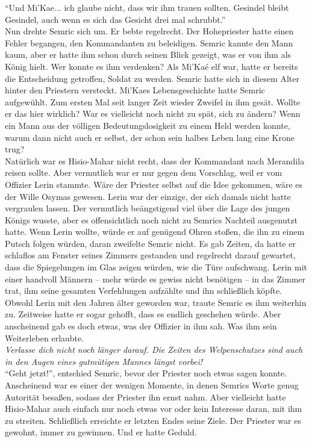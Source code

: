 ``Und Mi'Kae... ich glaube nicht, dass wir ihm trauen sollten. Gesindel bleibt Gesindel, auch wenn 
es sich das Gesicht drei mal schrubbt.''\\
Nun drehte Semric sich um. Er bebte regelrecht. Der Hohepriester hatte einen Fehler begangen, den  
Kommandanten zu beleidigen. Semric kannte den Mann kaum, aber er hatte ihm schon durch seinen Blick 
gezeigt, was er von ihm als König hielt. Wer konnte es ihm verdenken? Als Mi'Kaé elf war, hatte er 
bereits die Entscheidung getroffen, Soldat zu werden. Semric hatte sich in diesem Alter hinter den 
Priestern versteckt. Mi'Kaes Lebensgeschichte hatte Semric aufgewühlt. Zum ersten Mal seit langer 
Zeit wieder Zweifel in ihm gesät. Wollte er das hier wirklich? War es vielleicht noch nicht zu 
spät, sich zu ändern? Wenn ein Mann aus der völligen Bedeutungslosigkeit zu einem Held werden 
konnte, warum dann nicht auch er selbst, der schon sein halbes Leben lang eine Krone trug?\\
Natürlich war es Hisio-Mahar nicht recht, dass der Kommandant nach Merandila reisen sollte. Aber 
vermutlich war er nur gegen dem Vorschlag, weil er vom Offizier Lerin stammte. Wäre der Priester 
selbst auf die Idee gekommen, wäre es der Wille Osymas gewesen. Lerin war der einzige, der sich 
damals nicht hatte vergraulen lassen. Der vermutlich beängstigend viel über die Lage des jungen 
Königs wusste, aber es offensichtlich noch nicht zu Semrics Nachteil ausgenutzt hatte. Wenn Lerin 
wollte, würde er auf genügend Ohren stoßen, die ihn zu einem Putsch folgen würden, daran zweifelte 
Semric nicht. Es gab Zeiten, da hatte er schlaflos am Fenster seines Zimmers gestanden und 
regelrecht darauf gewartet, dass die Spiegelungen im Glas zeigen würden, wie die Türe aufschwang. 
Lerin mit einer handvoll Männern – mehr würde es gewiss nicht benötigen – in das Zimmer trat, ihm 
seine gesamten Verfehlungen aufzählte und ihn schließlich köpfte. Obwohl Lerin mit den Jahren älter 
geworden war, traute Semric es ihm weiterhin zu. Zeitweise hatte er sogar gehofft, dass es endlich 
geschehen würde. Aber anscheinend gab es doch etwas, was der Offizier in ihm sah. Was ihm sein 
Weiterleben erlaubte.\\
\textit{Verlasse dich nicht noch länger darauf. Die Zeiten des Welpenschutzes sind auch in den 
Augen eines gutmütigen Mannes längst vorbei!}\\
``Geht jetzt!'', entschied Semric, bevor der Priester noch etwas sagen konnte. \\
Anscheinend war es einer der wenigen Momente, in denen Semrics Worte genug Autorität besaßen, 
sodass der Priester ihn ernst nahm. Aber vielleicht hatte Hisio-Mahar auch einfach nur noch etwas 
vor oder kein Interesse daran, mit ihm zu streiten. Schließlich erreichte er letzten Endes seine 
Ziele. Der Priester war es gewohnt, immer zu gewinnen. Und er hatte Geduld. \\



